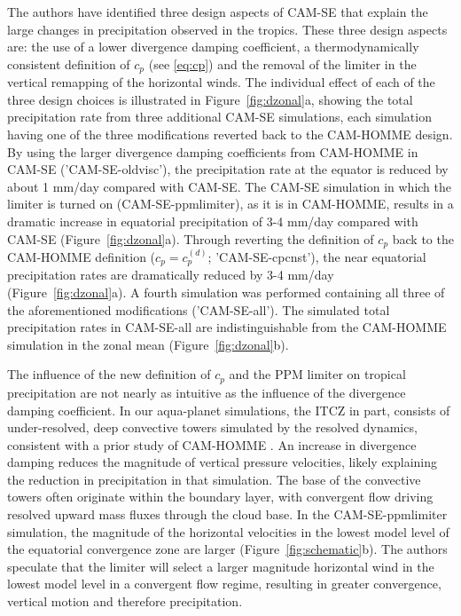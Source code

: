 \documentclass{agujournal}
\begin{document}
{The authors have identified three design aspects of CAM-SE that explain the large changes in precipitation observed in the tropics. These three design aspects are: the use of a lower divergence damping coefficient, a thermodynamically consistent definition of $c_p$ (see \eqref{eq:cp}) and the removal of the limiter in the vertical remapping of the horizontal winds. The individual effect of each of the three design choices is illustrated in Figure~\ref{fig:dzonal}a, showing the total precipitation rate from three additional CAM-SE simulations, each simulation having one of the three modifications reverted back to the CAM-HOMME design. By using the larger divergence damping coefficients from CAM-HOMME in CAM-SE ('CAM-SE-oldvisc'), the precipitation rate at the equator is reduced by about 1 mm/day compared with CAM-SE. The CAM-SE simulation in which the limiter is turned on (CAM-SE-ppmlimiter), as it is in CAM-HOMME, results in a dramatic increase in equatorial precipitation of 3-4 mm/day compared with CAM-SE (Figure~\ref{fig:dzonal}a). Through reverting the definition of $c_p$ back to the CAM-HOMME definition ($c_p = c_p^{(d)}$; 'CAM-SE-cpcnst'), the near equatorial precipitation rates are dramatically reduced by 3-4 mm/day (Figure~\ref{fig:dzonal}a). A fourth simulation was performed containing all three of the aforementioned modifications ('CAM-SE-all'). The simulated total precipitation rates in CAM-SE-all are indistinguishable from the CAM-HOMME simulation in the zonal mean (Figure~\ref{fig:dzonal}b).

The influence of the new definition of $c_p$ and the PPM limiter on tropical precipitation are not nearly as intuitive as the influence of the divergence damping coefficient. In our aqua-planet simulations, the ITCZ in part, consists of under-resolved, deep convective towers simulated by the resolved dynamics, consistent with a prior study of CAM-HOMME \citep{HR2017JCLIM}. An increase in divergence damping reduces the magnitude of vertical pressure velocities, likely explaining the reduction in precipitation in that simulation. The base of the convective towers often originate within the boundary layer, with convergent flow driving resolved upward mass fluxes through the cloud base. In the CAM-SE-ppmlimiter simulation, the magnitude of the horizontal velocities in the lowest model level of the equatorial convergence zone are larger (Figure~\ref{fig:schematic}b). The authors speculate that the limiter will select a larger magnitude horizontal wind in the lowest model level in a convergent flow regime, resulting in greater convergence, vertical motion and therefore precipitation.

}
\end{document}

